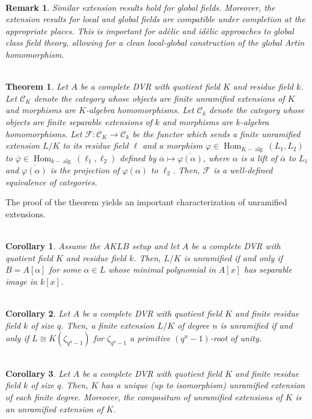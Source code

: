 \documentclass[11pt]{article}
\newcommand{\iso}{\cong}
\newcommand{\mc}[1]{\mathcal{#1}}
\newcommand{\ms}[1]{\mathscr{#1}}
\newcommand{\ov}[1]{\overline{#1}}
\DeclareMathOperator{\alg}{alg} %
\DeclareMathOperator{\Hom}{Hom}
\renewcommand{\phi}{\varphi}
\renewcommand{\l}{\ell}
\newtheorem*{corollary*}{\\Corollary}
\newtheorem*{remark*}{\\Remark}
\newtheorem*{theorem*}{\\Theorem}
\begin{document}
\begin{remark*}
Similar extension results hold for global fields. Moreover, the extension results for local and global fields are compatible under completion at the appropriate places. This is important for ad\`{e}lic and id\`{e}lic approaches to global class field theory, allowing for a clean local-global construction of the global Artin homomorphism.
\end{remark*}

\begin{theorem*}
Let $A$ be a complete DVR with quotient field $K$ and residue field $k$. Let $\mc{C}_K$ denote the category whose objects are finite unramified extensions of $K$ and morphisms are $K$-algebra homomorphisms. Let $\mc{C}_k$ denote the category whose objects are finite separable extensions of $k$ and morphisms are $k$-algebra homomorphisms. Let $\ms{F}: \mc{C}_K\to\mc{C}_k$ be the functor which sends a finite unramified extension $L/K$ to its residue field $\l$ and a morphism $\phi\in\Hom_{K-\alg}(L_1,L_2)$ to $\ov{\phi}\in\Hom_{k-\alg}(\l_1,\l_2)$ defined by $\ov{\alpha}\mapsto\ov{\phi(\alpha)}$, where $\alpha$ is a lift of $\ov{\alpha}$ to $L_1$ and $\ov{\phi(\alpha)}$ is the projection of $\phi(\alpha)$ to $\l_2$. Then, $\ms{F}$ is a well-defined equivalence of categories.
\end{theorem*}

The proof of the theorem yields an important characterization of unramified extensions.

\begin{corollary*}
Assume the $AKLB$ setup and let $A$ be a complete DVR with quotient field $K$ and residue field $k$. Then, $L/K$ is unramified if and only if $B=A[\alpha]$ for some $\alpha\in L$ whose minimal polynomial in $A[x]$ has separable image in $k[x]$.
\end{corollary*}

\begin{corollary*}
Let $A$ be a complete DVR with quotient field $K$ and finite residue field $k$ of size $q$. Then, a finite extension $L/K$ of degree $n$ is unramified if and only if $L\iso K(\zeta_{q^n-1})$ for $\zeta_{q^n-1}$ a primitive $(q^n-1)$-root of unity.
\end{corollary*}

\begin{corollary*}
Let $A$ be a complete DVR with quotient field $K$ and finite residue field $k$ of size $q$. Then, $K$ has a unique (up to isomorphism) unramified extension of each finite degree. Moreover, the compositum of unramified extensions of $K$ is an unramified extension of $K$.
\end{corollary*}
\end{document}
